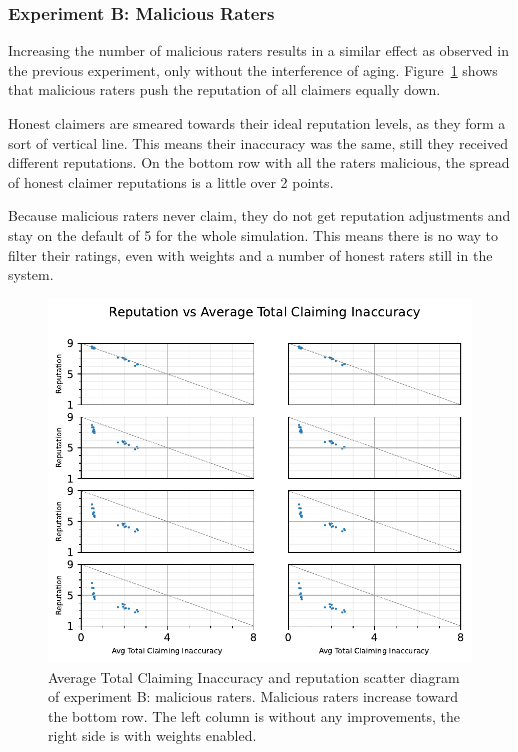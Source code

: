 \documentclass[%
    ]{\PathToTumTemplate/thesis/tum_thesis}
\begin{document}
\subsubsection{Experiment B: Malicious Raters}

Increasing the number of malicious raters results in a similar effect as observed in the previous experiment, only without the interference of aging.
Figure~\ref{fig:res_b_scatter} shows that malicious raters push the reputation of all claimers equally down.

Honest claimers are smeared towards their ideal reputation levels, as they form a sort of vertical line.
This means their inaccuracy was the same, still they received different reputations.
On the bottom row with all the raters malicious, the spread of honest claimer reputations is a little over 2 points.

Because malicious raters never claim, they do not get reputation adjustments and stay on the default of 5 for the whole simulation.
This means there is no way to filter their ratings, even with weights and a number of honest raters still in the system.

\begin{figure}[tbp]
  \begin{center}
        \includegraphics[width=0.75\linewidth]	{../results/b/AvgTotClaimInaccuracyAndReputationScatter_joined.pdf}
    \caption{
    Average Total Claiming Inaccuracy and reputation scatter diagram of experiment B: malicious raters.
    Malicious raters increase toward the bottom row.
    The left column is without any improvements, the right side is with weights enabled.
    }
    \label{fig:res_b_scatter}
  \end{center}
\end{figure}
\end{document}
